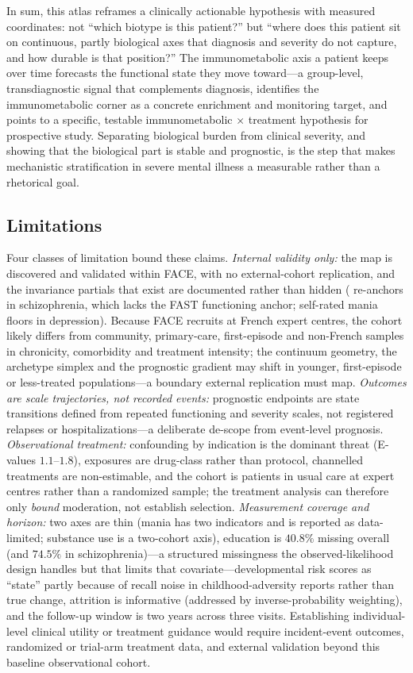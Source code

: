 In sum, this atlas reframes a clinically actionable hypothesis with measured
coordinates: not ``which biotype is this patient?'' but ``where does this patient sit
on continuous, partly biological axes that diagnosis and severity do not capture, and
how durable is that position?'' The immunometabolic axis a patient keeps over time
forecasts the functional state they move toward---a group-level, transdiagnostic signal
that complements diagnosis, identifies the immunometabolic corner as a concrete
enrichment and monitoring target, and points to a specific, testable immunometabolic
$\times$ treatment hypothesis for prospective study. Separating biological burden from clinical
severity, and showing that the biological part is stable and prognostic, is the step
that makes mechanistic stratification in severe mental illness a measurable rather than
a rhetorical goal.

\subsection*{Limitations}

Four classes of limitation bound these claims. \emph{Internal validity only:} the map
is discovered and validated within FACE, with no external-cohort replication, and the
invariance partials that exist are documented rather than hidden (\Gfac{} re-anchors in
schizophrenia, which lacks the FAST functioning anchor; self-rated mania floors in
depression). Because FACE recruits at French expert centres, the cohort likely differs from
community, primary-care, first-episode and non-French samples in chronicity, comorbidity and
treatment intensity; the continuum geometry, the archetype simplex and the prognostic gradient
may shift in younger, first-episode or less-treated populations---a boundary external
replication must map.
\emph{Outcomes are scale trajectories, not recorded events:} prognostic endpoints are
state transitions defined from repeated functioning and severity scales, not registered
relapses or hospitalizations---a deliberate de-scope from event-level prognosis.
\emph{Observational treatment:} confounding by indication is the dominant threat
(E-values $1.1$--$1.8$), exposures are drug-class rather than protocol, channelled
treatments are non-estimable, and the cohort is patients in usual care at expert
centres rather than a randomized sample; the treatment analysis can therefore only
\emph{bound} moderation, not establish selection. \emph{Measurement coverage and
horizon:} two axes are thin (mania has two indicators and is reported as data-limited;
substance use is a two-cohort axis), education is $40.8\%$ missing overall (and $74.5\%$
in schizophrenia)---a structured missingness the observed-likelihood design handles but
that limits that covariate---developmental risk scores as ``state'' partly because of
recall noise in childhood-adversity reports rather than true change, attrition is
informative (addressed by inverse-probability weighting), and the follow-up window is
two years across three visits. Establishing individual-level clinical utility or
treatment guidance would require incident-event outcomes, randomized or trial-arm
treatment data, and external validation beyond this baseline observational cohort.
